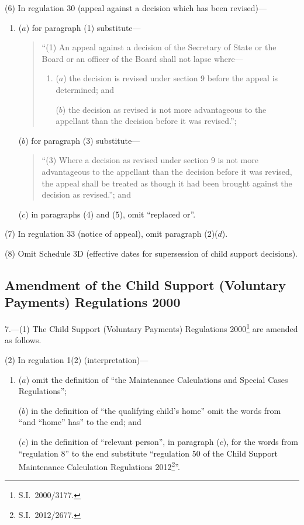 \documentclass[12pt,a4paper]{article}
\begin{document}
(6) In regulation 30 (appeal against a decision which has been revised)—
\begin{enumerate}\item[]
($a$) for paragraph (1) substitute—
\begin{quotation}
“(1) An appeal against a decision of the Secretary of State or the Board or an officer of the Board shall not lapse where—
\begin{enumerate}\item[]
($a$) the decision is revised under section 9 before the appeal is determined; and

($b$) the decision as revised is not more advantageous to the appellant than the decision before it was revised.”;
\end{enumerate}
\end{quotation}

($b$) for paragraph (3) substitute—
\begin{quotation}
“(3) Where a decision as revised under section 9 is not more advantageous to the appellant than the decision before it was revised, the appeal shall be treated as though it had been brought against the decision as revised.”; and
\end{quotation}

($c$) in paragraphs (4) and (5), omit “replaced or”.
\end{enumerate}

(7) In regulation 33 (notice of appeal), omit paragraph (2)($d$).

(8) Omit Schedule 3D (effective dates for supersession of child support decisions).

\subsection[7. Amendment of the Child Support (Voluntary Payments) Regulations 2000]{\sloppy Amendment of the Child Support (Voluntary Payments) Regulations 2000}

7.---(1)  The Child Support (Voluntary Payments) Regulations 2000\footnote{S.I.~2000/3177.} are amended as follows.

(2) In regulation 1(2) (interpretation)—
\begin{enumerate}\item[]
($a$) omit the definition of “the Maintenance Calculations and Special Cases Regulations”;

($b$) in the definition of “the qualifying child’s home” omit the words from “and “home” has” to the end; and

($c$) in the definition of “relevant person”, in paragraph ($c$), for the words from “regulation 8” to the end substitute “regulation 50 of the Child Support Maintenance Calculation Regulations 2012\footnote{S.I.~2012/2677.}”.
\end{enumerate}
\end{document}
